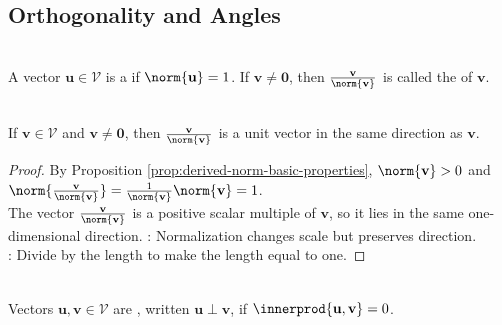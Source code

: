 \subsection{Orthogonality and Angles}

\begin{definition} \label{def:unit-vector-and-normalization} \\
A vector $\mathbf{u}\in\mathcal{V}$ is a  if $\norm{\mathbf{u}}=1$. If $\mathbf{v}\neq\mathbf{0}$, then $\frac{\mathbf{v}}{\norm{\mathbf{v}}}$ is called the  of $\mathbf{v}$.
\end{definition}

\begin{proposition} \label{prop:normalization-gives-unit-vector} \\
If $\mathbf{v}\in\mathcal{V}$ and $\mathbf{v}\neq\mathbf{0}$, then $\frac{\mathbf{v}}{\norm{\mathbf{v}}}$ is a unit vector in the same direction as $\mathbf{v}$.
\begin{proof}
By Proposition \ref{prop:derived-norm-basic-properties}, $\norm{\mathbf{v}}>0$ and $\norm{\frac{\mathbf{v}}{\norm{\mathbf{v}}}} =\frac{1}{\norm{\mathbf{v}}}\norm{\mathbf{v}}=1$.\\
The vector $\frac{\mathbf{v}}{\norm{\mathbf{v}}}$ is a positive scalar multiple of $\mathbf{v}$, so it lies in the same one-dimensional direction.
: Normalization changes scale but preserves direction.\\
: Divide by the length to make the length equal to one.
\end{proof}
\end{proposition}

\begin{definition} \label{def:orthogonal-vectors} \\
Vectors $\mathbf{u},\mathbf{v}\in\mathcal{V}$ are , written $\mathbf{u}\perp\mathbf{v}$, if $\innerprod{\mathbf{u},\mathbf{v}}=0$.
\end{definition}

